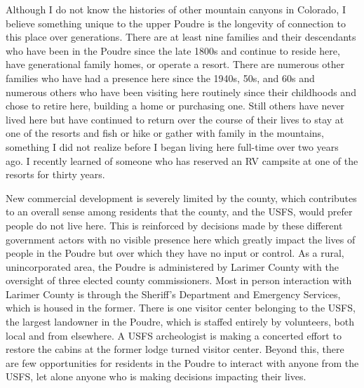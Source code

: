 \documentclass[
]{article}
\begin{document}
Although I do not know the histories of other mountain canyons in Colorado, I believe something unique to the upper Poudre is the longevity of connection to this place over generations. There are at least nine families and their descendants who have been in the Poudre since the late 1800s and continue to reside here, have generational family homes, or operate a resort. There are numerous other families who have had a presence here since the 1940s, 50s, and 60s and numerous others who have been visiting here routinely since their childhoods and chose to retire here, building a home or purchasing one. Still others have never lived here but have continued to return over the course of their lives to stay at one of the resorts and fish or hike or gather with family in the mountains, something I did not realize before I began living here full-time over two years ago. I recently learned of someone who has reserved an RV campsite at one of the resorts for thirty years.

New commercial development is severely limited by the county, which contributes to an overall sense among residents that the county, and the USFS, would prefer people do not live here. This is reinforced by decisions made by these different government actors with no visible presence here which greatly impact the lives of people in the Poudre but over which they have no input or control. As a rural, unincorporated area, the Poudre is administered by Larimer County with the oversight of three elected county commissioners. Most in person interaction with Larimer County is through the Sheriff's Department and Emergency Services, which is housed in the former. There is one visitor center belonging to the USFS, the largest landowner in the Poudre, which is staffed entirely by volunteers, both local and from elsewhere. A USFS archeologist is making a concerted effort to restore the cabins at the former lodge turned visitor center. Beyond this, there are few opportunities for residents in the Poudre to interact with anyone from the USFS, let alone anyone who is making decisions impacting their lives.
\end{document}
